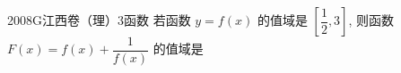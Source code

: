 
\begin{problem}{2008}{G}{江西卷（理）}{3}{函数}
若函数 $ y = f(x) $ 的值域是 $ \left[ \dfrac{1}{2}, 3 \right] $, 则函数 $ F(x) = f(x) + \dfrac{1}{f(x)} $ 的值域是
\begin{choices}
\end{choices}
\end{problem}

\begin{answer}

\end{answer}

\begin{solutions}

\end{solutions}